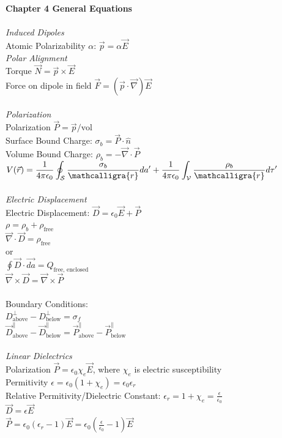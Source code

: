 \documentclass[12pt]{article}
\newcommand{\ds}{\displaystyle}
\newcommand{\scripty}[1]{\ensuremath{\mathcalligra{#1}}}
\begin{document}
\begin{flushleft}
\textbf{Chapter 4 General Equations}\\~\\

\textit{Induced Dipoles}\\
Atomic Polarizability $\alpha$: $\vec{p}=\alpha\vec{E}$\\
\textit{Polar Alignment}\\
Torque $\vec{N}=\vec{p}\times\vec{E}$\\
Force on dipole in field $\ds\vec{F}=(\vec{p}\cdot\vec{\nabla})\vec{E}$\\~\\

\textit{Polarization}\\
Polarization $\ds \vec{P}=\vec{p}/\text{vol}$\\
Surface Bound Charge: $\ds \sigma_b=\vec{P}\cdot\hat{n}$\\
Volume Bound Charge: $\ds \rho_b=-\vec{\nabla}\cdot\vec{P}$\\
$\ds V(\vec{r})=\frac{1}{4\pi\epsilon_0}\oint_\mathcal{S}\frac{\sigma_b}{\scripty{r}}da'+\frac{1}{4\pi\epsilon_0}\int_\mathcal{V}\frac{\rho_b}{\scripty{r}}d\tau'$\\~\\

\textit{Electric Displacement}\\
Electric Displacement: $\vec{D}=\epsilon_0\vec{E}+\vec{P}$\\
$\rho=\rho_b+\rho_\text{free}$\\
$\ds \vec{\nabla}\cdot\vec{D}=\rho_\text{free}$\\
or\\
$\ds \oint\vec{D}\cdot\vec{da}=Q_\text{free, enclosed}$\\
$\ds \vec{\nabla}\times\vec{D}=\vec{\nabla}\times\vec{P}$\\~\\

Boundary Conditions:\\
$\ds D^\perp_\text{above}-D^\perp_\text{below}=\sigma_f$\\
$\ds \vec{D}^\parallel_\text{above}-\vec{D}^\parallel_\text{below}=\vec{P}^\parallel_\text{above}-\vec{P}^\parallel_\text{below}$\\~\\

\textit{Linear Dielectrics}\\
Polarization $\vec{P}=\epsilon_0\chi_e\vec{E}$, where $\chi_e$ is electric susceptibility\\
Permitivity $\epsilon=\epsilon_0(1+\chi_e)=\epsilon_0\epsilon_r$\\
Relative Permitivity/Dielectric Constant: $\ds \epsilon_r=1+\chi_e=\frac{\epsilon}{\epsilon_0}$\\
$\vec{D}=\epsilon\vec{E}$\\
$\vec{P}=\epsilon_0(\epsilon_r-1)\vec{E}=\epsilon_0(\frac{\epsilon}{\epsilon_0}-1)\vec{E}$\\~\\


\end{flushleft}
\end{document}
